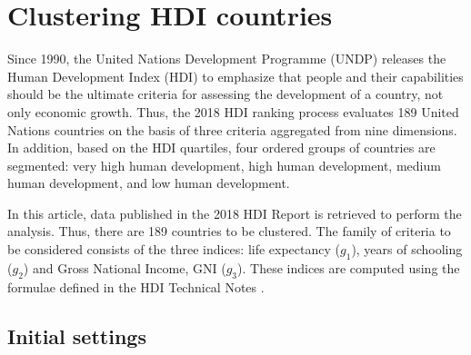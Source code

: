 \documentclass[]{elsarticle}
\theoremstyle{definition}
\begin{document}
%
%
%
%
%
%





\section{Clustering HDI countries}\label{application}

Since 1990, the United Nations Development Programme (UNDP) releases the Human Development Index (HDI) to emphasize that people and their capabilities should be the ultimate criteria for assessing the development of a country, not only economic growth. Thus, the 2018 HDI ranking process evaluates  189 United Nations countries on the basis of three criteria aggregated from nine dimensions. In addition, based on the HDI quartiles, four ordered groups of countries are segmented: very high human development, high human development, medium human development, and low human development.  

In this article, data published in the 2018 HDI Report is retrieved to perform the analysis. Thus, there are 189 countries to be clustered. The family of criteria to be considered consists of the three indices: life expectancy ($g_1$), years of schooling ($g_2$) and Gross National Income, GNI  ($g_3$).  These indices are computed using the formulae defined in the HDI Technical Notes \citep{UNDP2019}.   

\subsection{Initial settings}
\end{document}
